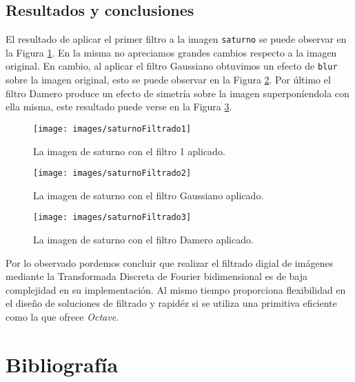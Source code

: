 \documentclass{article}
\begin{document}
\begin{multicols}{2}
\section{Resultados y conclusiones}
\label{sec4}

\par El resultado de aplicar el primer filtro a la imagen \verb+saturno+ se puede observar en la Figura \ref{saturnoFilter1}. En la misma no apreciamos grandes cambios respecto a la imagen original. En cambio, al aplicar el filtro Gaussiano obtuvimos un efecto de \verb+blur+ sobre la imagen original, esto se puede observar en la Figura \ref{saturnoFilter2}. Por último el filtro Damero produce un efecto de simetría sobre la imagen superponíendola con ella misma, este resultado puede verse en la Figura \ref{saturnoFilter3}.

\begin{figure}[H]
\centering
\texttt{[image: images/saturnoFiltrado1]}
\caption{La imagen de saturno con el filtro 1 aplicado.}
\label{saturnoFilter1}
\end{figure}

\begin{figure}[H]
\centering
\texttt{[image: images/saturnoFiltrado2]}
\caption{La imagen de saturno con el filtro Gaussiano aplicado.}
\label{saturnoFilter2}
\end{figure}

\begin{figure}[H]
\centering
\texttt{[image: images/saturnoFiltrado3]}
\caption{La imagen de saturno con el filtro Damero aplicado.}
\label{saturnoFilter3}
\end{figure}


\par Por lo observado pordemos concluir que realizar el filtrado digial de imágenes mediante la Transformada Discreta de Fourier bidimensional es de baja complejidad en su implementación. Al mismo tiempo proporciona flexibilidad en el diseño de soluciones de filtrado y rapidéz si se utiliza una primitiva eficiente como la que ofrece \textit{Octave}.\\

\end{multicols}

\section{Bibliografía} 
\end{document}
